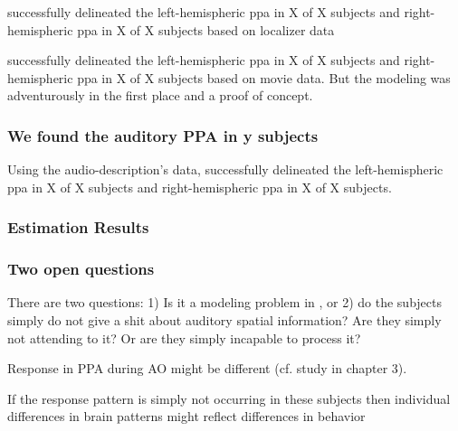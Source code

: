 \citet{sengupta2016extension} successfully delineated the left-hemispheric
\ac{ppa} in X of X subjects and right-hemispheric \ac{ppa} in X of X subjects
based on localizer data

\citet{haeusler2022processing} successfully delineated the left-hemispheric
\ac{ppa} in X of X subjects and right-hemispheric \ac{ppa} in X of X subjects
based on movie data.
%
But the modeling was adventurously in the first place and a proof of concept.


\subsubsection{We found the auditory PPA in y subjects}

Using the audio-description's data, \citet{haeusler2022processing} successfully
delineated the left-hemispheric \ac{ppa} in X of X subjects and
right-hemispheric \ac{ppa} in X of X subjects.



\subsubsection{Estimation Results}


\subsubsection{Two open questions}

%
There are two questions:
%
1) Is it a modeling problem in \citet{haeusler2022processing}, or
%
2) do the subjects simply do not give a shit about auditory spatial
information? Are they simply not attending to it? Or are they simply incapable
to process it?

%
Response in PPA during AO might be different (cf. study in chapter 3).

%
If the response pattern is simply not occurring in these subjects then
individual differences in brain patterns might reflect differences in behavior




